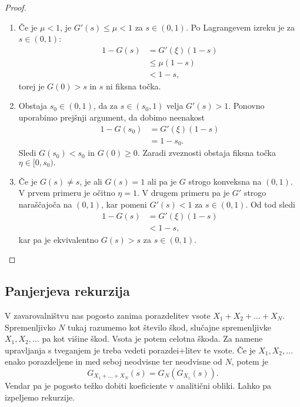 \documentclass[10pt, a4paper]{article}
\newenvironment{noticeC}{%
  \tcolorbox[%
  notitle,
  empty,
  enhanced,  %
  breakable,
  coltext=black, 
  fontupper=\rmfamily,
  noparskip,
  sharp corners,
  boxrule=-1pt,  %
  frame hidden,
  left=7pt,  %
  right=7pt,
  top=5pt,
  bottom=5pt,
  before skip=2.5ex plus 2pt,
  after skip=2.5ex plus 2pt,
  overlay unbroken and last={%
  },
  ]}
{\endtcolorbox}
\newenvironment{dokaz}%
  {\begin{noticeC}\begin{proof}}%
  {\end{proof}\end{noticeC}}
\begin{document}
\begin{dokaz}
  \begin{enumerate}
    \item Če je $\mu < 1$, je $G'(s) \leq \mu < 1$ za $s \in (0, 1)$.
    Po Lagrangevem izreku je za $s \in (0, 1)$:
    \begin{align*}
      1 - G(s) &= G'(\xi) (1 - s)\\
      &\leq \mu (1 - s)\\
      &< 1 - s,
    \end{align*}
    torej je $G(0) > s$ in $s$ ni fiksna točka.
    \item Obstaja $s_0 \in (0, 1)$, da za $s \in (s_0, 1)$ velja $G'(s) > 1$.
    Ponovno uporabimo prejšnji argument, da dobimo neenakost 
    \begin{align*}
      1 - G(s_0) &= G'(\xi) (1 - s)\\
      &= 1 - s_0.
    \end{align*}
    Sledi $G(s_0) < s_0$ in $G(0) \geq 0$.
    Zaradi zveznosti obstaja fiksna točka $\eta \in [0, s_0).$
    \item Če je $G(s) \neq s$, je ali $G(s) = 1$ ali pa je $G$ strogo konveksna na 
    $(0, 1)$. V prvem primeru je očitno $\eta = 1$. V drugem primeru pa je $G'$ strogo naraščajoča
    na $(0, 1)$, kar pomeni $G'(s) < 1$ za $s \in (0, 1)$.
    Od tod sledi 
    \begin{align*}
      1 - G(s) &= G'(\xi) (1 - s)\\
      &< 1 - s,
    \end{align*}
    kar pa je ekvivalentno $G(s) > s$ za $s \in (0, 1)$. \qedhere
  \end{enumerate}
\end{dokaz}

\subsection{Panjerjeva rekurzija}

V zavarovalništvu nas pogosto zanima porazdelitev vsote $X_1 + X_2 + \dots + X_N$.
Spremenljivko $N$ tukaj razumemo kot število škod, slučajne spremenljivke $X_1, X_2, \dots$
pa kot višine škod. Vsota je potem celotna škoda.
Za namene upravljanja s tveganjem je treba vedeti porazdei+litev te vsote.
Če je $X_1, X_2, \dots$ enako porazdeljene in med seboj neodvisne ter neodvisne od $N$,
potem je $$G_{X_1 + \dots + X_N} (s) = G_N (G_{X_1} (s)).$$
Vendar pa je pogosto težko dobiti koeficiente v analitični obliki.
Lahko pa izpeljemo rekurzije.
\end{document}

